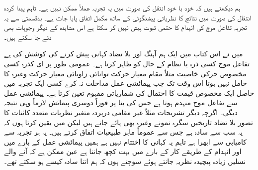 ہم دیکھتے ہیں کہ خود با خود انتقل کی صورت میں یہ تجربہ عملاً ممکن نہیں ہے۔ تاہم پیدا کردہ انتقال کی صورت میں نتائج کا نظریاتی پیشنگوئی کے ساتھ مکمل اتفاق پایا جات ہے۔ بدقسمتی سے یہ تجربہ تفاعل موج کی انہدام کا  حتمی  ثبوت پیش نہیں کر سکتا ہے اس مشاہدہ کے دیگر وجوہات بھی دئے جا سکتے ہیں۔ 

میں نے اس کتاب میں ایک ہم آہنگ  اور بلا تضاد کہانی پیش کرنے کی کوشش کی ہے تفاعل موج  کسی ذرہ یا نظام کے حال کو ظاہر کرتا ہے۔ عمومی طور پر ای کذرہ کسی مخصوص حرکی خاصیت مثلاً مقام معیار حرکت توانائی زاویائی معیار حرکت وغیرہ کا حامل نہیں ہوتا اس وقت تک  جب پیمائشی عمل مداخلت نہ کرے کسی ایک تجربہ میں حاصل ایک مخصوص قیمت کا احتمال  کی شماریاتی مفہوم تعین کرتا ہے۔ پیمائشی عمل سے تفاعل موج منہدم ہوتا ہے جس کی بنا پر فوراً دوسری پیمائش لازماً وہی نتیجہ دیگی۔ اگرچہ دیگر تشریحات مثلاً غیر مقامی درپردہ متغیر نظریات متعدد کائنات کا تصور بلا تضاد تاریخیں  سگرہ نمونے وغیرہ بھی پائے جاتے ہیں لیکن میں یقین کرتا ہوں کہ یہ سب سے سادہ ہے جس سے عموماً ماہر طبیعیات اتفاق کرتے ہیں۔ یہ ہر تجربہ سے کامیابی سے ابھرا ہے تاہم یہ کہانی کا اختتام نہیں ہے ہمیں پیمائشی عمل کے بارے میں اور انہدام کے طریقے کار کے بارے میں بہت کچھ جاننا ہے عین ممکن ہے کہ آنے والے نسلیں زیادہ پیچیدہ  نظریہ جانتے ہوئے سوچتے ہوں کہ ہم اتنا سادہ کیسے ہو سکتے تھے۔

